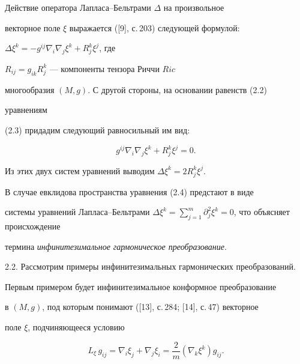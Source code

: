 \begin{pf} 


Действие оператора Лапласа--Бельтрами $\Delta$ на произвольное 


векторное поле $\xi$ выражается ([9], с.\,203) следующей формулой: 


$\Delta\xi^k=-g^{ij}\nabla_i\nabla_j\xi^k+ R^k_j\xi^j$, где 


$R_{ij}=g_{ik}R^k_j$ --- компоненты тензора Риччи $Ric$  %


многообразия $(M,g)$. С другой стороны, на основании равенств (2.2) 


уравнениям 


(2.3) придадим следующий равносильный им вид: 


\begin{equation} 


g^{ij}\nabla_i\nabla_j\xi^k+R^k_j\xi^j=0. 


\end{equation} 


Из этих двух систем уравнений выводим $\Delta\xi^k=2R^k_j\xi^j$. 


\end{pf} 


 


\begin{notes} 


В случае евклидова пространства уравнения (2.4) предстают в виде 


системы уравнений Лапласа--Бельтрами $\Delta\xi^k= 


\sum\limits^m_{j=1}\partial^2_j\xi^k=0$, что объясняет происхождение 


термина {\it инфинитезимальное гармоническое преобразование}. 


\end{notes} 


 


2.2. Рассмотрим примеры инфинитезимальных гармонических преобразований. 


Первым примером будет инфинитезимальное конформное преобразование 


в $(M,g)$, под которым понимают ([13], с.\,284; [14], с.\,47) векторное 


поле $\xi$, подчиняющееся условию 


\begin{equation} 


L_\xi\,g_{ij}=\nabla_i\xi_j+\nabla_j\xi_i=\frac{2}{m} 


(\nabla_k\xi^k)g_{ij}. 


\end{equation} 


